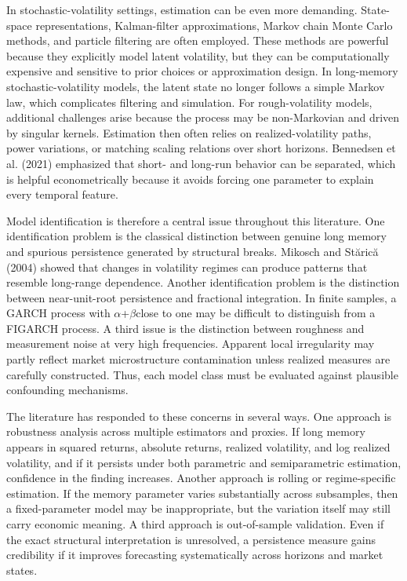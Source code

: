 \documentclass[12pt]{article}
\begin{document}
In stochastic-volatility settings, estimation can be even more demanding. State-space representations, Kalman-filter approximations, Markov chain Monte Carlo methods, and particle filtering are often employed. These methods are powerful because they explicitly model latent volatility, but they can be computationally expensive and sensitive to prior choices or approximation design. In long-memory stochastic-volatility models, the latent state no longer follows a simple Markov law, which complicates filtering and simulation. For rough-volatility models, additional challenges arise because the process may be non-Markovian and driven by singular kernels. Estimation then often relies on realized-volatility paths, power variations, or matching scaling relations over short horizons. Bennedsen et al. (2021) emphasized that short- and long-run behavior can be separated, which is helpful econometrically because it avoids forcing one parameter to explain every temporal feature.

Model identification is therefore a central issue throughout this literature. One identification problem is the classical distinction between genuine long memory and spurious persistence generated by structural breaks. Mikosch and St\u{a}ric\u{a} (2004) showed that changes in volatility regimes can produce patterns that resemble long-range dependence. Another identification problem is the distinction between near-unit-root persistence and fractional integration. In finite samples, a GARCH process with $\alpha$+$\beta$close to one may be difficult to distinguish from a FIGARCH process. A third issue is the distinction between roughness and measurement noise at very high frequencies. Apparent local irregularity may partly reflect market microstructure contamination unless realized measures are carefully constructed. Thus, each model class must be evaluated against plausible confounding mechanisms.

The literature has responded to these concerns in several ways. One approach is robustness analysis across multiple estimators and proxies. If long memory appears in squared returns, absolute returns, realized volatility, and log realized volatility, and if it persists under both parametric and semiparametric estimation, confidence in the finding increases. Another approach is rolling or regime-specific estimation. If the memory parameter varies substantially across subsamples, then a fixed-parameter model may be inappropriate, but the variation itself may still carry economic meaning. A third approach is out-of-sample validation. Even if the exact structural interpretation is unresolved, a persistence measure gains credibility if it improves forecasting systematically across horizons and market states.
\end{document}
